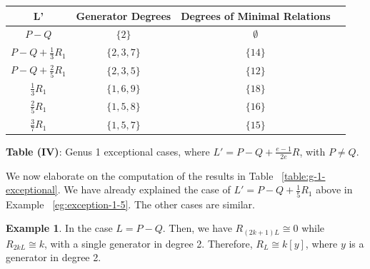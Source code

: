 \documentclass{amsart}
\theoremstyle{plain}
\theoremstyle{definition}
\newtheorem{example}[thm]{Example}
\theoremstyle{remark}
\newtheorem{rem}[thm]{Remark}
\numberwithin{equation}{section}
\begin{document}
\begin{longtable}	{| c || c | c | c |}
	\hline
	L' & Generator Degrees & Degrees of Minimal Relations \\
	\hline
	\hline
	$P-Q$ & $\{2\}$ & $\emptyset$ \\	\hline

	$P-Q + \frac{1}{3}R_1$ & $\{2,3,7\}$ & $\{14\}$ \\	\hline

	$P-Q + \frac{2}{5}R_1$ & $\{2,3,5\}$ & $\{12\}$ \\	\hline
	
	$\frac{1}{3}R_1$ & $\{1,6,9\}$ & $\{18\}$ \\	\hline

	$\frac{2}{5}R_1$ & $\{1,5,8\}$ & $\{16\}$ \\	\hline
	
	$\frac{3}{7}R_1$ & $\{1,5,7\}$ & $\{15\}$ \\	\hline
	
	
\end{longtable}

\begin{center}
\label{table:g-1-exceptional}
\textbf{Table (IV)}: Genus 1 exceptional cases, where $L' = P-Q + \frac{e-1}{2e}R$, with $P \neq Q$.
\end{center}

We now elaborate on the computation of the results in 
Table ~\ref{table:g-1-exceptional}. We have already explained the case of 
$L' = P-Q + \frac{1}{5}R_1$ above in Example ~\ref{eg:exception-1-5}. The other cases are similar.

\iffalse
\begin{example}
\label{eg:exceptional-1-0}
In the case $L=P - Q.$ Then, we have $R_{(2k+1)L} \cong 0$ while $R_{2kL} \cong k$, with a single generator in degree 2. Therefore, $R_L \cong k[y]$, where $y$ is a generator in degree 2. 
\end{example}
\end{document}
